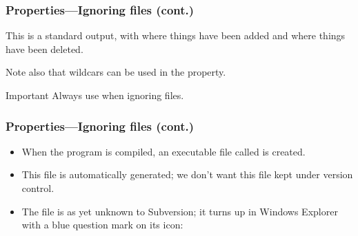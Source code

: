 \begin{frame}[fragile]
    \frametitle{Properties---Ignoring files (cont.)}
    \linuxframe

    This is a standard  output, with \ttalert{+} where
    things have been added and \ttalert{-} where things have been deleted.

    Note also that wildcars can be used in the 
    property.

    \begin{alertblock}{Important}
    Always use  when ignoring files.
    \end{alertblock}
\end{frame}

\begin{frame}[fragile]
    \frametitle{Properties---Ignoring files (cont.)}

    \begin{itemize}
        \item When the  program is compiled, an executable file called
             is created.
        \item This file is automatically generated; we don't want this file
            kept under version control.
        \item The file is as yet unknown to Subversion; it turns up in
            Windows Explorer with a blue question mark on its icon:
    \end{itemize}

    \begin{center}
    \end{center}
\end{frame}

